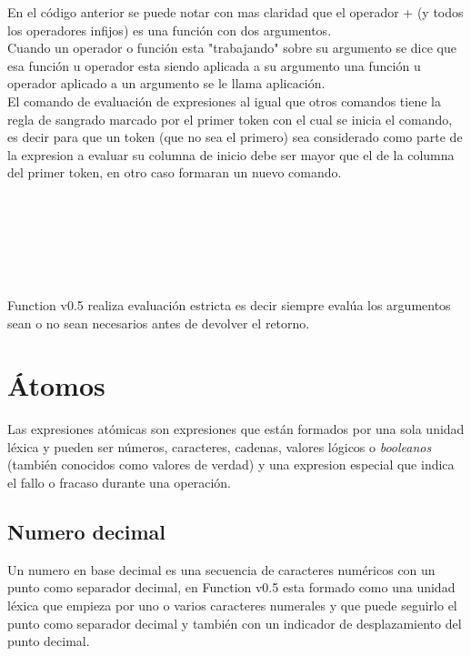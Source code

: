       En el código anterior se puede notar con mas claridad que el operador + (y todos los operadores infijos) es una función con dos argumentos.
      \\
      
      Cuando un operador o función esta "trabajando" sobre su argumento se dice que esa función u operador esta siendo aplicada a su argumento una función u operador aplicado a un argumento se le llama aplicación.
      \\
      
      El comando de evaluación de expresiones al igual que otros comandos tiene la regla de sangrado marcado por el primer token con el cual se inicia el comando, es decir para que un token (que no sea el primero) sea considerado como parte de la expresion a evaluar su columna de inicio debe ser mayor que el de la columna del primer token, en otro caso formaran un nuevo comando.
      \\
      
      \begin{fxcode}
           \\
          \\
         \\
          \\
         \\
      \end{fxcode}
      
      Function v0.5 realiza evaluación estricta es decir siempre evalúa los argumentos sean o no sean necesarios antes de devolver el retorno.
      
   \section{Átomos}
      Las expresiones atómicas son expresiones que están formados por una sola unidad léxica y pueden ser números, caracteres, cadenas, valores lógicos o {\it booleanos} (también conocidos como valores de verdad) y una expresion especial que indica el fallo o fracaso durante una operación.
      
      \subsection{Numero decimal}
      Un numero en base decimal es una secuencia de caracteres numéricos con un punto como separador decimal, en Function v0.5 esta formado como una unidad léxica que empieza por uno o varios caracteres numerales y que puede seguirlo el punto como separador decimal y también con un indicador de desplazamiento del punto decimal.\\
      
